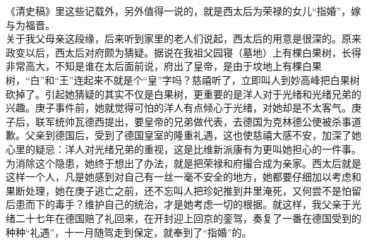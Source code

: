 《清史稿》里这些记载外，另外值得一说的，就是西太后为荣禄的女儿“指婚”，嫁与为福晋。\\

  关于我父母亲这段缘，后来听到家里的老人们说起，西太后的用意是很深的。原来政变以后，西太后对府颇为猜疑。据说在我祖父园寝（墓地）上有棵白果树，长得非常高大，不知是谁在太后面前说，府出了皇帝，是由于坟地上有棵白果树，“白”和“王”连起来不就是个“皇”字吗？慈禧听了，立即叫人到妙高峰把白果树砍掉了。引起她猜疑的其实不仅是白果树，更重要的是洋人对于光绪和光绪兄弟的兴趣。庚子事件前，她就觉得可怕的洋人有点倾心于光绪，对她却是不太客气。庚子后，联军统帅瓦德西提出，要皇帝的兄弟做代表，去德国为克林德公使被杀事道歉。父亲到德国后，受到了德国皇室的隆重礼遇，这也使慈禧大感不安，加深了她心里的疑忌：洋人对光绪兄弟的重视，这是比维新派康有为更叫她担心的一件事。为消除这个隐患，她终于想出了办法，就是把荣禄和府撮合成为亲家。西太后就是这样一个人，凡是她感到对自己有一丝一毫不安全的地方，她都要仔细加以考虑和果断处理，她在庚子逃亡之前，还不忘叫人把珍妃推到井里淹死，又何尝不是怕留后患而下的毒手？维护自己的统治，才是她考虑一切的根据。就这样，我父亲于光绪二十七年在德国赔了礼回来，在开封迎上回京的銮驾，奏复了一番在德国受到的种种“礼遇”，十一月随驾走到保定，就奉到了“指婚”的。